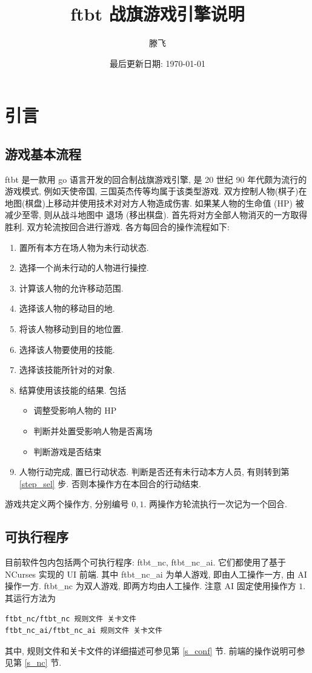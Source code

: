 \documentclass[UTF8, zihao=-4]{ctexart} %
\title{ftbt 战旗游戏引擎说明}
\date{最后更新日期: \today}
\author{滕飞}
\begin{document}
\maketitle

\section{引言}
\subsection{游戏基本流程}
\label{s_intro}
ftbt 是一款用 go 语言开发的回合制战旗游戏引擎, 是 20 世纪 90 年代颇为流行的游戏模式, 例如天使帝国, 三国英杰传等均属于该类型游戏. 
双方控制人物(棋子)在地图(棋盘)上移动并使用技术对对方人物造成伤害. 如果某人物的生命值 (HP) 被减少至零, 则从战斗地图中
退场 (移出棋盘). 首先将对方全部人物消灭的一方取得胜利. 双方轮流按回合进行游戏. 各方每回合的操作流程如下: 
\begin{enumerate}
      \item 置所有本方在场人物为未行动状态.
      \item \label{step_sel}选择一个尚未行动的人物进行操控.
      \item 计算该人物的允许移动范围.
      \item \label{step_move}选择该人物的移动目的地.
      \item 将该人物移动到目的地位置.
      \item \label{step_tech}选择该人物要使用的技能.
      \item \label{step_obj}选择该技能所针对的对象.
      \item 结算使用该技能的结果. 包括
            \begin{itemize}
                  \item 调整受影响人物的 HP
                  \item 判断并处置受影响人物是否离场
                  \item 判断游戏是否结束
            \end{itemize}
      \item 人物行动完成, 置已行动状态. 判断是否还有未行动本方人员, 有则转到第 \ref{step_sel} 步. 否则本操作方在本回合的行动结束.
\end{enumerate}
游戏共定义两个操作方, 分别编号 $0, 1$. 两操作方轮流执行一次记为一个回合.

\subsection{可执行程序}
\label{s_exec}
目前软件包内包括两个可执行程序: ftbt\_nc, ftbt\_nc\_ai. 
它们都使用了基于 NCurses 实现的 UI 前端. 其中 ftbt\_nc\_ai 为单人游戏, 即由人工操作一方, 由 AI 操作一方.
ftbt\_nc 为双人游戏, 即两方均由人工操作. 注意 AI 固定使用操作方 $1$.
其运行方法为
\begin{lstlisting}[language=bash]
ftbt_nc/ftbt_nc 规则文件 关卡文件
ftbt_nc_ai/ftbt_nc_ai 规则文件 关卡文件
\end{lstlisting}
其中, 规则文件和关卡文件的详细描述可参见第 \ref{s_conf} 节. 前端的操作说明可参见第 \ref{s_nc} 节.
\end{document}
